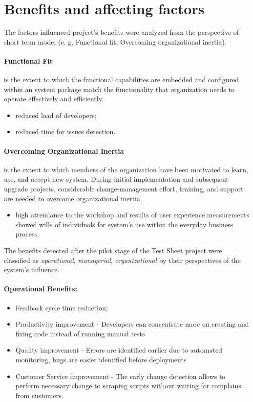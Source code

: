 \section{Benefits and affecting factors}
The factors influenced project's benefits were analyzed from the perspective of short term model (e. g. Functional fit, Overcoming organizational inertia).
\paragraph{Functional Fit} is the extent to which the functional capabilities are embedded and configured within an system package match the functionality that organization needs to operate effectively and efficiently.
\begin{itemize}
	\item reduced load of developers;
	\item reduced time for issues detection.
\end{itemize}

\paragraph{Overcoming Organizational Inertia} is the extent to which members of the organization have been motivated to learn, use, and accept new system. During initial implementation and subsequent upgrade projects, considerable change-management effort, training, and support are needed to overcome organizational inertia.
\begin{itemize}
	\item high attendance to the workshop and  results of user experience measurements showed wills of individuals for system's use within the everyday business process.
\end{itemize}

The benefits detected after the pilot stage of the Test Sheet project were classified  as \textit{operational}, \textit{managerial}, \textit{organizational} by their perspectives of the system's influence.

\paragraph{Operational Benefits:}
\begin{itemize}
	\item Feedback cycle time reduction;
	\item Productivity improvement - Developers can concentrate more on creating and fixing code instead of running manual tests
	\item Quality improvement - Errors are identified earlier due to automated monitoring, bugs are easier identified before deployments
	\item Customer Service improvement - The early change detection allows to perform necessary change to scraping scripts without waiting for complains from customers.
\end{itemize}

